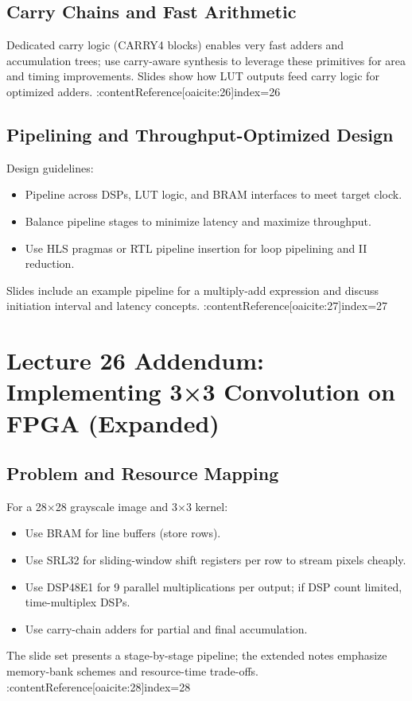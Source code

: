 \documentclass[11pt]{article}
\begin{document}
\subsection{Carry Chains and Fast Arithmetic}
Dedicated carry logic (CARRY4 blocks) enables very fast adders and accumulation trees; use carry-aware synthesis to leverage these primitives for area and timing improvements. Slides show how LUT outputs feed carry logic for optimized adders. :contentReference[oaicite:26]{index=26}

\subsection{Pipelining and Throughput-Optimized Design}
Design guidelines:
\begin{itemize}
  \item Pipeline across DSPs, LUT logic, and BRAM interfaces to meet target clock.
  \item Balance pipeline stages to minimize latency and maximize throughput.
  \item Use HLS pragmas or RTL pipeline insertion for loop pipelining and II reduction.
\end{itemize}
Slides include an example pipeline for a multiply-add expression and discuss initiation interval and latency concepts. :contentReference[oaicite:27]{index=27}

\newpage

\section{Lecture 26 Addendum: Implementing 3×3 Convolution on FPGA (Expanded)}

\subsection{Problem and Resource Mapping}
For a 28×28 grayscale image and 3×3 kernel:
\begin{itemize}
  \item Use BRAM for line buffers (store rows).
  \item Use SRL32 for sliding-window shift registers per row to stream pixels cheaply.
  \item Use DSP48E1 for 9 parallel multiplications per output; if DSP count limited, time-multiplex DSPs.
  \item Use carry-chain adders for partial and final accumulation.
\end{itemize}
The slide set presents a stage-by-stage pipeline; the extended notes emphasize memory-bank schemes and resource-time trade-offs. :contentReference[oaicite:28]{index=28}
\end{document}
